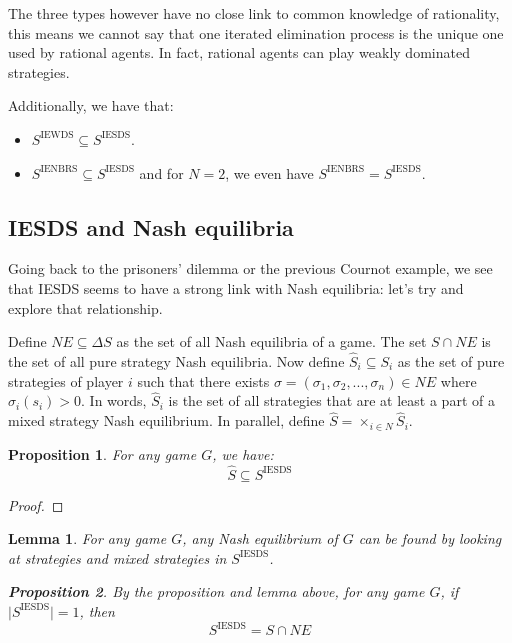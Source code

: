 \documentclass[12pt]{report}
\newtheorem{lemma}{Lemma}[chapter]
\newtheorem{proposition}{Proposition}[chapter]
\begin{document}
The three types however have no close link to common knowledge of rationality, this means we cannot say that one iterated elimination process is the unique one used by rational agents. In fact, rational agents can play weakly dominated strategies. 

Additionally, we have that:\begin{itemize}
\item $S^{\text{IEWDS}}\subseteq S^{\text{IESDS}}$.
\item $S^{\text{IENBRS}}\subseteq S^{\text{IESDS}}$ and for $N=2$, we even have $S^{\text{IENBRS}}= S^{\text{IESDS}}$.
\end{itemize}


\subsection{IESDS and Nash equilibria}

Going back to the prisoners' dilemma or the previous Cournot example, we see that IESDS seems to have a strong link with Nash equilibria: let's try and explore that relationship.

Define $NE\subseteq \Delta S$ as the set of all Nash equilibria of a game. The set $S\cap NE$ is the set of all pure strategy Nash equilibria. Now define $\hat S_i\subseteq S_i$ as the set of pure strategies of player $i$ such that there exists $\sigma = (\sigma_1, \sigma_2, ..., \sigma_n) \in NE $ where $\sigma_i(s_i)>0$. In words, $\hat S_i$ is the set of all strategies that are at least a part of a mixed strategy Nash equilibrium. In parallel, define $\hat S = \times_{i\in N} \hat S_i $.

\begin{proposition}
For any game $G$, we have: $$\hat S \subseteq S^{\text{IESDS}} $$
\end{proposition}

\begin{proof}

\end{proof}

\begin{lemma}
For any game $G$, any Nash equilibrium of $G$ can be found by looking at strategies and mixed strategies in $S^{\text{IESDS}}$.

\begin{proposition}
By the proposition and lemma above, for any game $G$, if $\vert S^{\text{IESDS}}\vert = 1$, then $$ S^{\text{IESDS}} = S\cap NE $$
\end{proposition}
\end{lemma}
\end{document}
